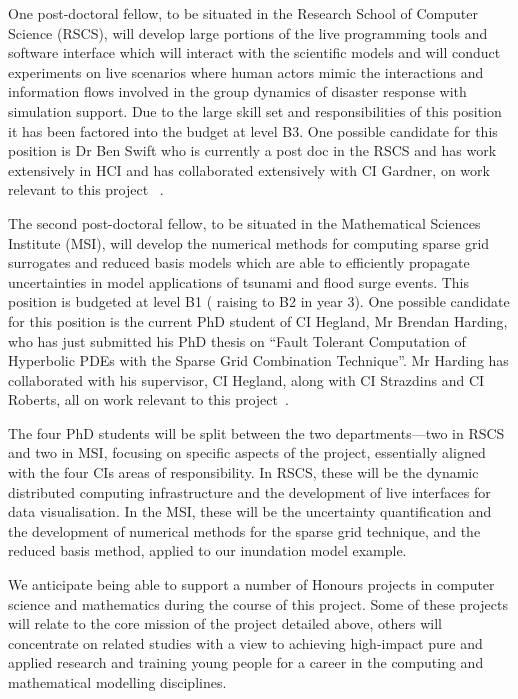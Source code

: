 One post-doctoral fellow, to be situated in the
Research School of Computer Science (RSCS), will develop large
portions of the live programming tools and software interface which
will interact with the scientific models and will conduct experiments
on live scenarios where human actors mimic the interactions and
information flows involved in the group dynamics of disaster response
with simulation support. Due to the large skill set and responsibilities of 
this position it has been factored into the budget at level B3.
One possible candidate for this position is 
Dr Ben Swift who is currently a post doc in the RSCS and has work 
extensively in HCI and has collaborated extensively with CI Gardner, on work 
relevant to this project ~\parencite{martin2015tracking,martin2016intelligent,swiftLive2016,
swift2013visual,swift2014coding}.

The second post-doctoral fellow, to be
situated in the Mathematical Sciences Institute (MSI), will develop
the numerical methods for computing sparse grid surrogates and reduced
basis models which are able to efficiently propagate uncertainties in
model applications of tsunami and flood surge events. This 
position is budgeted at level B1 ( raising to B2 in year 3).
One possible candidate for this position is the current PhD 
student of CI Hegland, Mr Brendan Harding,  who has just 
submitted his PhD thesis on ``Fault Tolerant Computation of
Hyperbolic PDEs with the Sparse Grid Combination Technique''.
Mr Harding has collaborated with his supervisor, 
CI Hegland, along with CI Strazdins and CI Roberts, all
on work relevant to this project~\parencite{Ali11022016,AliEtal2015,deBaarHarding2015,
HardingHLS2015,StrazdinsEtal2015}.


The four PhD students will be split between the two departments---two
in RSCS and two in MSI, focusing on specific aspects of the project,
essentially aligned with the four CIs areas of responsibility.  In
RSCS, these will be the dynamic distributed computing infrastructure
and the development of live interfaces for data visualisation. In the
MSI, these will be the uncertainty quantification and the development
of numerical methods for the sparse grid technique, and the reduced
basis method, applied to our inundation model example.

We anticipate being able to support a number of Honours projects in
computer science and mathematics during the course of this
project. Some of these projects will relate to the core mission of the
project detailed above, others will concentrate on related studies
with a view to achieving high-impact pure and applied research and
training young people for a career in the computing and mathematical
modelling disciplines.

